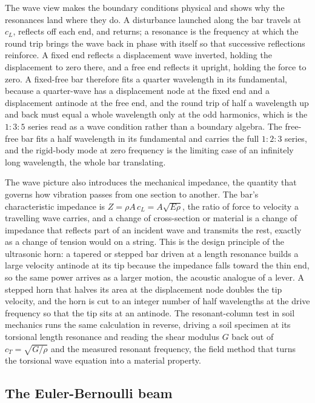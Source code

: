 The wave view makes the boundary conditions physical and shows why the
resonances land where they do. A disturbance launched along the bar
travels at $c_L$, reflects off each end, and returns; a resonance is the
frequency at which the round trip brings the wave back in phase with
itself so that successive reflections reinforce. A fixed end reflects a
displacement wave inverted, holding the displacement to zero there, and a
free end reflects it upright, holding the force to zero. A fixed-free bar
therefore fits a quarter wavelength in its fundamental, because a
quarter-wave has a displacement node at the fixed end and a displacement
antinode at the free end, and the round trip of half a wavelength up and
back must equal a whole wavelength only at the odd harmonics, which is
the $1 : 3 : 5$ series read as a wave condition rather than a boundary
algebra. The free-free bar fits a half wavelength in its fundamental and
carries the full $1 : 2 : 3$ series, and the rigid-body mode at zero
frequency is the limiting case of an infinitely long wavelength, the
whole bar translating.

The wave picture also introduces the mechanical impedance, the quantity
that governs how vibration passes from one section to another. The bar's
characteristic impedance is $Z = \rho A\,c_L = A\sqrt{E\rho}$, the ratio
of force to velocity a travelling wave carries, and a change of
cross-section or material is a change of impedance that reflects part of
an incident wave and transmits the rest, exactly as a change of tension
would on a string. This is the design principle of the ultrasonic horn:
a tapered or stepped bar driven at a length resonance builds a large
velocity antinode at its tip because the impedance falls toward the thin
end, so the same power arrives as a larger motion, the acoustic analogue
of a lever. A stepped horn that halves its area at the displacement node
doubles the tip velocity, and the horn is cut to an integer number of
half wavelengths at the drive frequency so that the tip sits at an
antinode. The resonant-column test in soil mechanics runs the same
calculation in reverse, driving a soil specimen at its torsional length
resonance and reading the shear modulus $G$ back out of $c_T =
\sqrt{G/\rho}$ and the measured resonant frequency, the field method that
turns the torsional wave equation into a material property.

\subsection{The Euler-Bernoulli beam}

